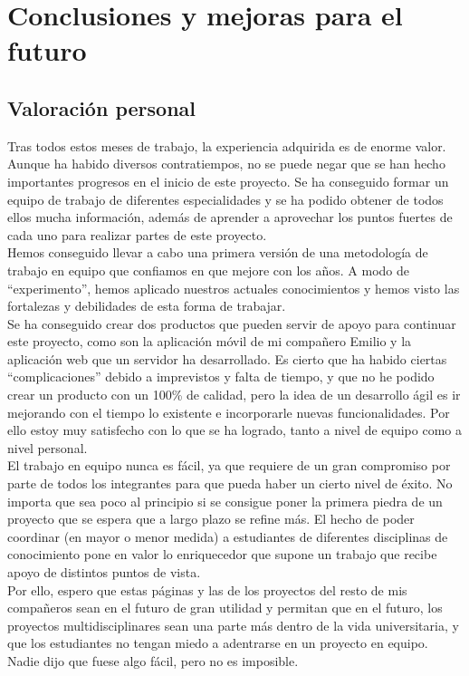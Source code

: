\chapter{Conclusiones y mejoras para el futuro}

\section{Valoración personal}
Tras todos estos meses de trabajo, la experiencia adquirida es de enorme valor. Aunque ha habido diversos contratiempos, no se puede negar que se han hecho importantes progresos en el inicio de este proyecto. Se ha conseguido formar un equipo de trabajo de diferentes especialidades y se ha podido obtener de todos ellos mucha información, además de aprender a aprovechar los puntos fuertes de cada uno para realizar partes de este proyecto.\\

Hemos conseguido llevar a cabo una primera versión de una metodología de trabajo en equipo que confiamos en que mejore con los años. A modo de ``experimento'', hemos aplicado nuestros actuales conocimientos y hemos visto las fortalezas y debilidades de esta forma de trabajar.\\

Se ha conseguido crear dos productos que pueden servir de apoyo para continuar este proyecto, como son la aplicación móvil de mi compañero Emilio y la aplicación web que un servidor ha desarrollado. Es cierto que ha habido ciertas ``complicaciones'' debido a imprevistos y falta de tiempo, y que no he podido crear un producto con un 100\% de calidad, pero la idea de un desarrollo ágil es ir mejorando con el tiempo lo existente e incorporarle nuevas funcionalidades. Por ello estoy muy satisfecho con lo que se ha logrado, tanto a nivel de equipo como a nivel personal.\\

El trabajo en equipo nunca es fácil, ya que requiere de un gran compromiso por parte de todos los integrantes para que pueda haber un cierto nivel de éxito. No importa que sea poco al principio si se consigue poner la primera piedra de un proyecto que se espera que a largo plazo se refine más. El hecho de poder coordinar (en mayor o menor medida) a estudiantes de diferentes disciplinas de conocimiento pone en valor lo enriquecedor que supone un trabajo que recibe apoyo de distintos puntos de vista.\\

Por ello, espero que estas páginas y las de los proyectos del resto de mis compañeros sean en el futuro de gran utilidad y permitan que en el futuro, los proyectos multidisciplinares sean una parte más dentro de la vida universitaria, y que los estudiantes no tengan miedo a adentrarse en un proyecto en equipo. Nadie dijo que fuese algo fácil, pero no es imposible.

